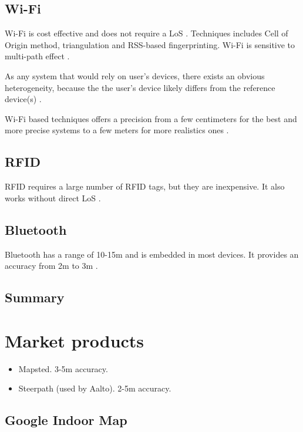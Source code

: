 \subsection{Wi-Fi}

Wi-Fi is cost effective and does not require a LoS \cite{mainetti_survey_2014}. Techniques includes Cell of Origin method, triangulation and RSS-based fingerprinting. Wi-Fi is sensitive to multi-path effect \cite{liu_survey_2020}.

As any system that would rely on user's devices, there exists an obvious heterogeneity, because the the user's device likely differs from the reference device(s) \cite{liu_survey_2020}.

Wi-Fi based techniques offers a precision from a few centimeters for the best and more precise systems to a few meters for more realistics ones \cite{liu_survey_2020}.

\subsection{RFID}

RFID requires a large number of RFID tags, but they are inexpensive. It also works without direct LoS \cite{mainetti_survey_2014}.

\subsection{Bluetooth}

Bluetooth has a range of 10-15m and is embedded in most devices. It provides an accuracy from 2m to 3m \cite{mainetti_survey_2014}.

\subsection{Summary}

\section{Market products}

\begin{itemize}
    \item Mapsted. 3-5m accuracy.
    \item Steerpath (used by Aalto). 2-5m accuracy.
\end{itemize}

\subsection{Google Indoor Map}
